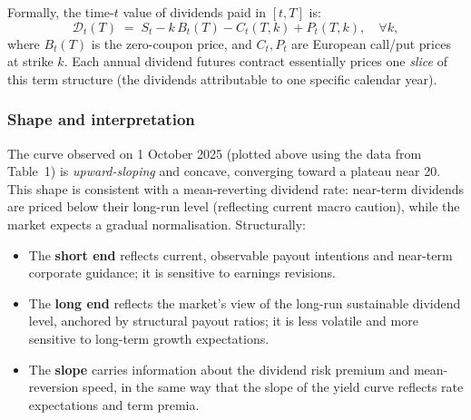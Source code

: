 \documentclass[12pt,a4paper]{article}
\begin{document}
Formally, the time-$t$ value of dividends paid in $[t,T]$ is:
\[
\mathcal{D}_t(T) \;=\; S_t - k\,B_t(T) - C_t(T,k) + P_t(T,k), \quad \forall k,
\]
where $B_t(T)$ is the zero-coupon price, and $C_t, P_t$ are European call/put prices
at strike $k$.
Each annual dividend futures contract essentially prices one \emph{slice} of this term
structure (the dividends attributable to one specific calendar year).
 
\subsubsection*{Shape and interpretation}
 
\begin{center}
\end{center}
 
\vspace{-4pt}
The curve observed on 1 October 2025 (plotted above using the data from Table~1) is
\emph{upward-sloping} and concave, converging toward a plateau near 20.
This shape is consistent with a mean-reverting dividend rate: near-term dividends are
priced below their long-run level (reflecting current macro caution), while the market
expects a gradual normalisation.
Structurally:
 
\begin{itemize}\setlength\itemsep{1pt}
  \item The \textbf{short end} reflects current, observable payout intentions and
    near-term corporate guidance; it is sensitive to earnings revisions.
  \item The \textbf{long end} reflects the market's view of the long-run sustainable
    dividend level, anchored by structural payout ratios; it is less volatile and more
    sensitive to long-term growth expectations.
  \item The \textbf{slope} carries information about the dividend risk premium and
    mean-reversion speed, in the same way that the slope of the yield curve reflects
    rate expectations and term premia.
\end{itemize}
 
\end{document}
